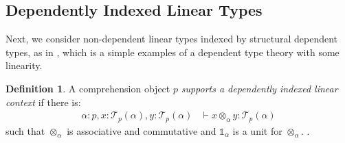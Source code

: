 \documentclass[10pt]{article}
\theoremstyle{definition}
\newtheorem{definition}{Definition}
\newcommand{\yields}{\vdash}
\newcommand\El[2]{\mathcal{T}_{#1}(#2)}
\newcommand\One{\ensuremath{\mathds{1}}}
\begin{document}

\subsection{Dependently Indexed Linear Types}

Next, we consider non-dependent linear types indexed by structural
dependent types, as in \citep{vakar}, which is a simple examples of a
dependent type theory with some linearity.

\begin{definition}
A comprehension object $p$ \emph{supports a dependently indexed linear context} if there is:
\begin{align*}
\alpha : p, x : \El{p}{\alpha}, y : \El{p}{\alpha} &\yields x \otimes_\alpha y : \El{p}{\alpha}
\end{align*}
such that $\otimes_\alpha$ is associative and commutative and $\One_\alpha$ is a unit for
$\otimes_\alpha$.
. 
\end{definition}

\end{document}
